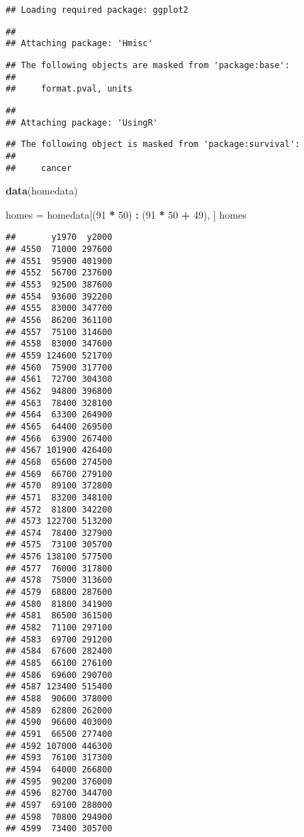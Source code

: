 \documentclass[]{article}
\newenvironment{Shaded}{\begin{snugshade}}{\end{snugshade}}
\newcommand{\KeywordTok}[1]{\textcolor[rgb]{0.13,0.29,0.53}{\textbf{#1}}}
\newcommand{\DecValTok}[1]{\textcolor[rgb]{0.00,0.00,0.81}{#1}}
\newcommand{\StringTok}[1]{\textcolor[rgb]{0.31,0.60,0.02}{#1}}
\newcommand{\OperatorTok}[1]{\textcolor[rgb]{0.81,0.36,0.00}{\textbf{#1}}}
\newcommand{\NormalTok}[1]{#1}
\begin{document}
\begin{verbatim}
## Loading required package: ggplot2
\end{verbatim}

\begin{verbatim}
## 
## Attaching package: 'Hmisc'
\end{verbatim}

\begin{verbatim}
## The following objects are masked from 'package:base':
## 
##     format.pval, units
\end{verbatim}

\begin{verbatim}
## 
## Attaching package: 'UsingR'
\end{verbatim}

\begin{verbatim}
## The following object is masked from 'package:survival':
## 
##     cancer
\end{verbatim}

\begin{Shaded}
\begin{Highlighting}[]
\KeywordTok{data}\NormalTok{(homedata)}

\NormalTok{homes =}\StringTok{ }\NormalTok{homedata[(}\DecValTok{91} \OperatorTok{*}\StringTok{ }\DecValTok{50}\NormalTok{) }\OperatorTok{:}\StringTok{ }\NormalTok{(}\DecValTok{91} \OperatorTok{*}\StringTok{ }\DecValTok{50} \OperatorTok{+}\StringTok{ }\DecValTok{49}\NormalTok{), ]}
\NormalTok{homes}
\end{Highlighting}
\end{Shaded}

\begin{verbatim}
##       y1970  y2000
## 4550  71000 297600
## 4551  95900 401900
## 4552  56700 237600
## 4553  92500 387600
## 4554  93600 392200
## 4555  83000 347700
## 4556  86200 361100
## 4557  75100 314600
## 4558  83000 347600
## 4559 124600 521700
## 4560  75900 317700
## 4561  72700 304300
## 4562  94800 396800
## 4563  78400 328100
## 4564  63300 264900
## 4565  64400 269500
## 4566  63900 267400
## 4567 101900 426400
## 4568  65600 274500
## 4569  66700 279100
## 4570  89100 372800
## 4571  83200 348100
## 4572  81800 342200
## 4573 122700 513200
## 4574  78400 327900
## 4575  73100 305700
## 4576 138100 577500
## 4577  76000 317800
## 4578  75000 313600
## 4579  68800 287600
## 4580  81800 341900
## 4581  86500 361500
## 4582  71100 297100
## 4583  69700 291200
## 4584  67600 282400
## 4585  66100 276100
## 4586  69600 290700
## 4587 123400 515400
## 4588  90600 378000
## 4589  62800 262000
## 4590  96600 403000
## 4591  66500 277400
## 4592 107000 446300
## 4593  76100 317300
## 4594  64000 266800
## 4595  90200 376000
## 4596  82700 344700
## 4597  69100 288000
## 4598  70800 294900
## 4599  73400 305700
\end{verbatim}
\end{document}
